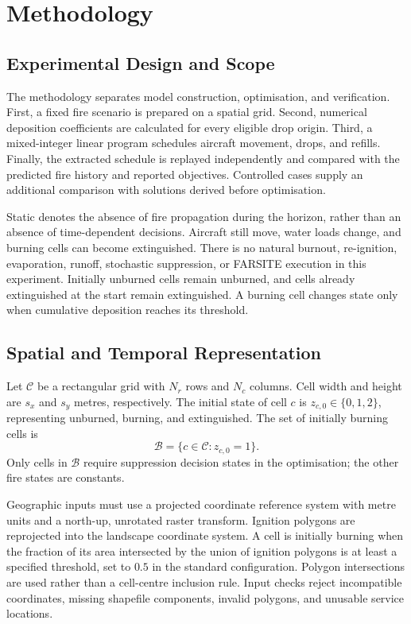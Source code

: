 \chapter{Methodology}
\label{ch:method}

\section{Experimental Design and Scope}
\label{sec:method-scope}

The methodology separates model construction, optimisation, and verification. First, a fixed fire scenario is prepared on a spatial grid. Second, numerical deposition coefficients are calculated for every eligible drop origin. Third, a mixed-integer linear program schedules aircraft movement, drops, and refills. Finally, the extracted schedule is replayed independently and compared with the predicted fire history and reported objectives. Controlled cases supply an additional comparison with solutions derived before optimisation.

Static denotes the absence of fire propagation during the horizon, rather than an absence of time-dependent decisions. Aircraft still move, water loads change, and burning cells can become extinguished. There is no natural burnout, re-ignition, evaporation, runoff, stochastic suppression, or FARSITE execution in this experiment. Initially unburned cells remain unburned, and cells already extinguished at the start remain extinguished. A burning cell changes state only when cumulative deposition reaches its threshold.

\section{Spatial and Temporal Representation}
\label{sec:method-grid}

Let $\mathcal{C}$ be a rectangular grid with $N_r$ rows and $N_c$ columns. Cell width and height are $s_x$ and $s_y$ metres, respectively. The initial state of cell $c$ is $z_{c,0}\in\{0,1,2\}$, representing unburned, burning, and extinguished. The set of initially burning cells is
\begin{equation}
    \mathcal{B}=\{c\in\mathcal{C}:z_{c,0}=1\}.
\end{equation}
Only cells in $\mathcal{B}$ require suppression decision states in the optimisation; the other fire states are constants.

Geographic inputs must use a projected coordinate reference system with metre units and a north-up, unrotated raster transform. Ignition polygons are reprojected into the landscape coordinate system. A cell is initially burning when the fraction of its area intersected by the union of ignition polygons is at least a specified threshold, set to $0.5$ in the standard configuration. Polygon intersections are used rather than a cell-centre inclusion rule. Input checks reject incompatible coordinates, missing shapefile components, invalid polygons, and unusable service locations.

